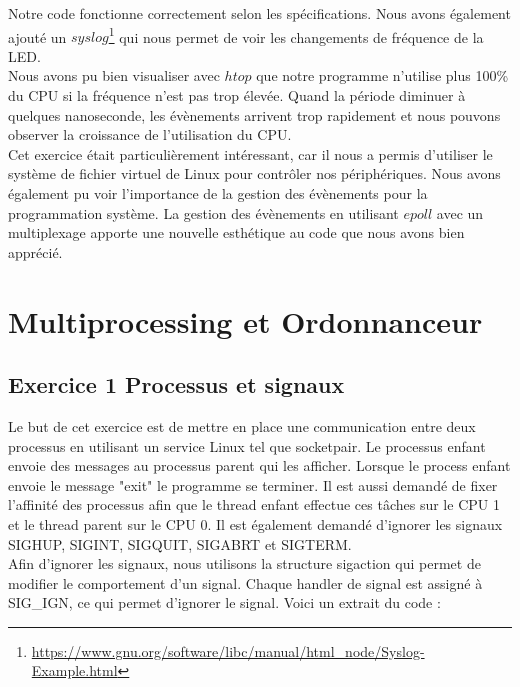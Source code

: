 \documentclass[
	a4paper, %
	10pt, %
]{CSUniSchoolLabReport}
\begin{document}
Notre code fonctionne correctement selon les spécifications. Nous avons également ajouté un $syslog$\footnote{\href{https://www.gnu.org/software/libc/manual/html_node/Syslog-Example.html}{https://www.gnu.org/software/libc/manual/html\_node/Syslog-Example.html}} qui nous permet de voir les changements de fréquence de la LED.\\
Nous avons pu bien visualiser avec $htop$ que notre programme n'utilise plus 100\% du CPU si la fréquence n'est pas trop élevée. Quand la période diminuer à quelques nanoseconde, les évènements arrivent trop rapidement et nous pouvons observer la croissance de l'utilisation du CPU.\\
Cet exercice était particulièrement intéressant, car il nous a permis d'utiliser le système de fichier virtuel de Linux pour contrôler nos périphériques. Nous avons également pu voir l'importance de la gestion des évènements pour la programmation système. La gestion des évènements en utilisant $epoll$ avec un multiplexage apporte une nouvelle esthétique au code que nous avons bien apprécié.

\section{Multiprocessing et Ordonnanceur}\label{multiprocess}
\subsection{Exercice 1 Processus et signaux}\label{MPEx1}
Le but de cet exercice est de mettre en place une communication entre deux processus en utilisant un service Linux tel que socketpair.
Le processus enfant envoie des messages au processus parent qui les afficher. Lorsque le process enfant envoie le message "exit" le programme se terminer.
Il est aussi demand\'e de fixer l'affinité des processus afin que le thread enfant effectue ces t\^aches sur le CPU 1 et le thread parent sur le CPU 0.
Il est également demandé d'ignorer les signaux SIGHUP, SIGINT, SIGQUIT, SIGABRT et SIGTERM.\\

Afin d'ignorer les signaux, nous utilisons la structure sigaction qui permet de modifier le comportement d'un signal.
Chaque handler de signal est assigné à SIG\_IGN, ce qui permet d'ignorer le signal.
Voici un extrait du code :
\end{document}
